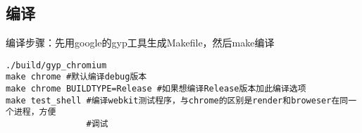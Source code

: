\subsection{编译}
编译步骤：先用google的gyp工具生成Makefile，然后make编译
\vspace{0.4cm}
\hrulefill{}
\begin{verbatim}
./build/gyp_chromium
make chrome #默认编译debug版本
make chrome BUILDTYPE=Release #如果想编译Release版本加此编译选项
make test_shell #编译webkit测试程序，与chrome的区别是render和broweser在同一个进程，方便
                #调试
\end{verbatim}
\hrulefill{}
\vspace{0.4cm}




